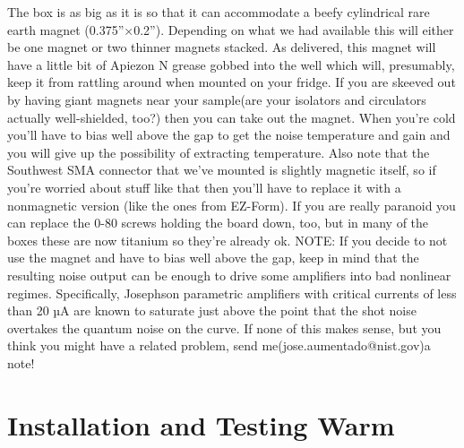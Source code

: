 \documentclass[11pt]{article}
\begin{document}
    The box is as big as it is so that it can accommodate a beefy cylindrical rare earth magnet (0.375”×0.2”). Depending on what we had available this will either be one magnet or two thinner magnets stacked. As delivered, this magnet will have a little bit of Apiezon N grease gobbed into the well which will, presumably, keep it from rattling around when mounted on your fridge. If you are skeeved out by having giant magnets near your sample(are your isolators and circulators actually well-shielded, too?) then you can take out the magnet. When you’re cold you’ll have to bias well above the gap to get the noise temperature and gain and you will give up the possibility of extracting temperature. Also note that the Southwest SMA connector that we’ve mounted is slightly magnetic itself, so if you’re worried about stuff like that then you’ll have to replace it with a nonmagnetic version (like the ones from EZ-Form). If you are really paranoid you can replace the 0-80 screws holding the board down, too, but in many of the boxes these are now titanium so they’re already ok. NOTE: If you decide to not use the magnet and have to bias well above the gap, keep in mind that the resulting noise output can be enough to drive some ampliﬁers into bad nonlinear regimes. Specifically, Josephson parametric ampliﬁers with critical currents of less than 20 µA are known to saturate just above the point that the shot noise overtakes the quantum noise on the curve. If none of this makes sense, but you think you might have a related problem, send me(jose.aumentado@nist.gov)a note!



\section{
Installation and Testing Warm}
\end{document}
